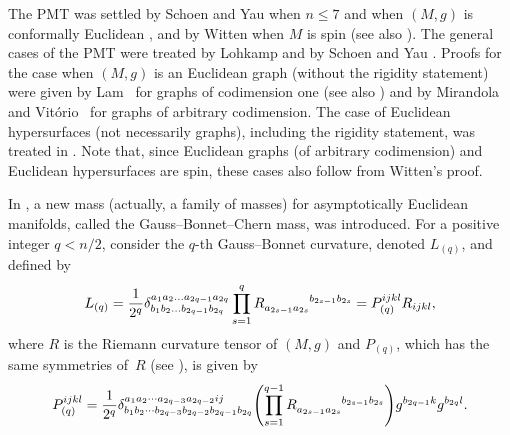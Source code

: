 \documentclass[pdftex]{sigma}
\numberwithin{equation}{section}
\begin{document}
The PMT was settled by Schoen and Yau when $n \leq 7$ \cite{Schoencompletemanifoldswithnonnegative1979, Schoenproofpositivemass1979, Schoentheenergyandthelinearmomentum1981} and when $(M,g)$ is conformally Euclidean \cite{SchoenConformallyflatmanifolds1988}, and by Witten when $M$ is spin \cite{Wittennewproofpositive1981} (see also \cite{ParkerWittenproofpositive1982}). The general cases of the PMT were treated by Lohkamp \cite{LohkampHigherDimensionalPositive2006,Lohkampskinstructuresonminimal2015, Lohkamphyperbolicgeometryandpotentialtheoryminimal2015, Lohkampskinstructuresinscalarcurvature2015} and by Schoen and Yau \cite{Schoenpositivescalarcurvatureandminimal2022}. Proofs for the case when $(M,g)$ is an Euclidean graph (without the rigidity statement) were given by Lam~\mbox{\cite{LamGraphsCasesRiemannian2010,LamGraphCasesRiemannian2011}} for graphs of codimension one (see also \cite{deLimaADMmassasymptotically2014}) and by Mirandola and Vit\'orio~\cite{Mirandolapositivemasstheorem2015} for graphs of arbitrary codimension. The case of Euclidean hypersurfaces (not necessarily graphs), including the rigidity statement, was treated in \cite{Huanghypersurfaceswithnonnegativescalar2013}. Note that, since Euclidean graphs (of arbitrary codimension) and Euclidean hypersurfaces are spin, these cases also follow from Witten's proof.

In \cite{GeAnewmassforasymptoticallyflatmanifolds2014}, a new mass (actually, a family of masses) for asymptotically Euclidean manifolds, called the Gauss--Bonnet--Chern mass, was introduced. For a positive integer $q < n/2$, consider the $q$-th Gauss--Bonnet curvature, denoted $L_{(q)}$, and defined by
\begin{equation*} %
  L_{(q)} = \frac{1}{2^q}
  \delta_{b_1 b_2 \ldots b_{2q - 1} b_{2q}}^{a_1 a_2 \ldots a_{2q - 1} a_{2q}}
  \prod_{s = 1}^{q} \tensor[]{R}{_{a_{2s - 1} a_{2s}}^{b_{2s - 1} b_{2s}}} = P_{(q)}^{ijkl}R_{ijkl},
\end{equation*}
where $R$ is the Riemann curvature tensor of $(M,g)$ and $P_{(q)}$, which has the same symmetries of~$R$ (see \cite[Section 3]{GeAnewmassforasymptoticallyflatmanifolds2014}), is given by
\begin{equation*} %
 P_{(q)}^{ijkl} = \frac{1}{2^q}\delta_{b_1b_2 \cdots b_{2q-3}b_{2q-2}b_{2q-1}b_{2q}}^{a_1a_2 \cdots a_{2q-3}a_{2q-2}ij}
 \Biggl( \prod_{s=1}^{q-1} R\indices{_{a_{2s-1}a_{2s}}^{b_{2s-1}b_{2s}}} \Biggr)g^{b_{2q-1}k}g^{b_{2q}l}.
\end{equation*}
\end{document}
